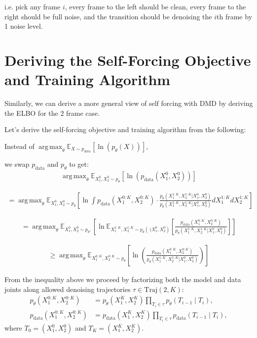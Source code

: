 \documentclass[11pt]{article}
\DeclareMathOperator*{\argmax}{arg\,max}
\begin{document}
i.e. pick any frame $i$, every frame to the left should be clean, every frame to the right should be full noise, and the transition should be denoising the $i$th frame by 1 noise level.


\section{Deriving the Self-Forcing Objective and Training Algorithm}

Similarly, we can derive a more general view of self forcing with DMD by deriving the ELBO for the 2 frame case.


Let's derive the self-forcing objective and training algorithm from the following:

Instead of $\argmax_\theta \mathbb{E}_{X \sim p_{\text{data}}} \left[ \ln(p_\theta(X)) \right]$,

we swap $p_{\text{data}}$ and $p_\theta$ to get:
\begin{align}
\argmax_\theta \mathbb{E}_{X_1^0, X_2^0 \sim p_\theta} \left[ \ln(p_{\text{data}}(X_1^0, X_2^0)) \right]
\end{align}

\begin{align}
= \argmax_\theta \mathbb{E}_{X_1^0, X_2^0 \sim p_\theta} \left[ \ln \int p_{\text{data}}(X_1^{0:K}, X_2^{0:K}) \cdot \frac{p_\theta(X_1^{1:K}, X_2^{1:K} | X_1^0, X_2^0)}{p_\theta(X_1^{1:K}, X_2^{1:K} | X_1^0, X_2^0)} dX_1^{1:K} dX_2^{1:K} \right]
\end{align}

\begin{align}
= \argmax_\theta \mathbb{E}_{X_1^0, X_2^0 \sim p_\theta, } \left[ \ln \mathbb{E}_{X_1^{1:K}, X_2^{1:K} \sim p_\theta(\cdot | X_1^0, X_2^0)} \left[ \frac{p_{\text{data}}(X_1^{0:K}, X_2^{0:K})}{p_\theta(X_1^{1:K}, X_2^{1:K} | X_1^0, X_2^0)} \right] \right]
\end{align}

\begin{align}
\geq \argmax_\theta \mathbb{E}_{X_1^{0:K}, X_2^{0:K} \sim p_\theta} \left[ \ln \left( \frac{p_{\text{data}}(X_1^{0:K}, X_2^{0:K})}{p_\theta(X_1^{1:K}, X_2^{1:K} | X_1^0, X_2^0)} \right) \right]
\end{align}

From the inequality above we proceed by factorizing both the model and
data joints along allowed denoising trajectories
$\tau \in \mathrm{Traj}(2,K)$:
\begin{align}
p_\theta(X_1^{0:K},X_2^{0:K})
  &= p_\theta(X_1^K,X_2^K)\prod_{T_i\in\tau} p_\theta(T_{i-1}\mid T_i),\\
p_{\text{data}}(X_1^{0:K},X_2^{0:K})
  &= p_{\text{data}}(X_1^K,X_2^K)\prod_{T_i\in\tau} p_{\text{data}}(T_{i-1}\mid T_i),
\end{align}
where $T_0=(X_1^0,X_2^0)$ and $T_K=(X_1^K,X_2^K)$.
\end{document}
